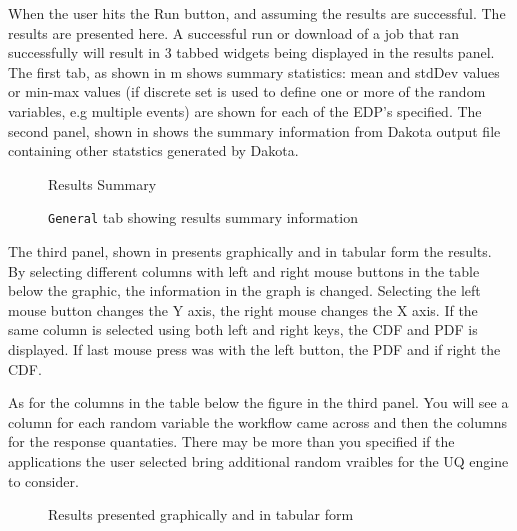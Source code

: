 When the user hits the Run button, and assuming the results are
successful. The results are presented here.  A successful run or
download of a job that ran successfully will result in 3 tabbed
widgets being displayed in the results panel.  The first tab, as shown in
m shows summary statistics: mean and
stdDev values or min-max values (if discrete set is used to define one or more of the random variables, e.g multiple events)
are shown for each of the EDP's specified. The second panel,
shown in  shows the summary
information from Dakota output file containing other statstics generated by Dakota.

\begin{figure}[!htbp]
  \caption{Results Summary}
  \label{fig:results_summary}
\end{figure}

\begin{figure}[!htbp]
  \caption{\texttt{General} tab showing results summary information}
  \label{fig:summary_information}
\end{figure}

The third panel, shown in  presents
graphically and in tabular form the results. By selecting different
columns with left and right mouse buttons in the table below the
graphic, the information in the graph is changed. Selecting the left
mouse button changes the Y axis, the right mouse changes the X
axis. If the same column is selected using both left and right keys,
the CDF and PDF is displayed. If last mouse press was with the left
button, the PDF and if right the CDF.
 
As for the columns in the table below the figure in the third panel. You will see a column for each random variable the workflow came across and then the columns for the response quantaties. There may be more than you specified if the applications the user selected bring additional random vraibles for the UQ engine to consider. 

\begin{figure}[!htbp]
  \caption{Results presented graphically and in tabular form}
  \label{fig:results_data}
\end{figure}
